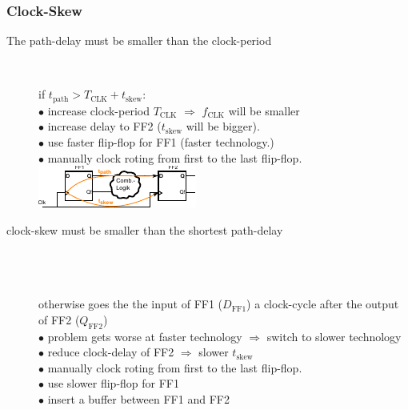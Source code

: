 \subsubsection{Clock-Skew}
\begin{description}
	\item[The path-delay must be smaller than the clock-period] \hfill \\
		\begin{multicols}{2}
			if $t_{\text{path}} > T_{\text{CLK}} + t_{\text{skew}}$: \\
			$\bullet$ increase clock-period $T_{\text{CLK}}$ $\Rightarrow$ $f_{\text{CLK}}$ will be smaller\\
			$\bullet$ increase delay to FF2 ($t_{\text{skew}}$ will be bigger).\\
			$\bullet$ use faster flip-flop for FF1 (faster technology.)\\
			$\bullet$ manually clock roting from first to the last flip-flop.
			\vfill
			\columnbreak
			\hspace{5mm}
			\includegraphics[width=1\linewidth]{images/High_Speed_Digital/Clock-Skew.pdf}
		\end{multicols}
		
	\item[clock-skew must be smaller than the shortest path-delay] \hfill \\
		 \\ \\
		otherwise goes the the input of FF1 ($D_{\text{FF1}}$) a clock-cycle after the output of FF2 ($Q_{\text{FF2}}$)\\
		$\bullet$ problem gets worse at faster technology $\Rightarrow$ switch to slower technology\\
		$\bullet$ reduce clock-delay of FF2 $\Rightarrow$ slower $t_{\text{skew}}$ \\
		$\bullet$ manually clock roting from first to the last flip-flop. \\
		$\bullet$ use slower flip-flop for FF1 \\
		$\bullet$ insert a buffer between FF1 and FF2	
\end{description}

